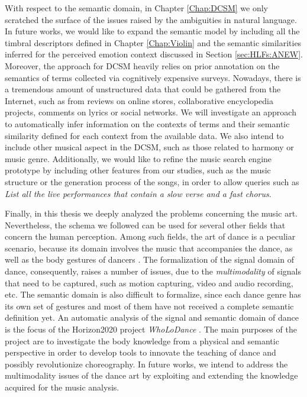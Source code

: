 With respect to the semantic domain, in  Chapter \ref{Chap:DCSM} we only scratched the surface of the issues raised by the ambiguities in natural language. In future works, we would like to expand the semantic model by including all the timbral descriptors defined in Chapter \ref{Chap:Violin} and the semantic similarities inferred for the perceived emotion context discussed in Section \ref{sec:HLFs:ANEW}. Moreover, the approach for DCSM heavily relies on prior annotation on the semantics of terms collected via cognitively expensive surveys. Nowadays, there is a tremendous amount of unstructured data that could be gathered from the Internet, such as from reviews on online stores, collaborative encyclopedia projects, comments on lyrics or social networks. We will investigate an approach to automatically infer information on the contexts of terms and their semantic similarity defined for each context from the available data. We also intend to include other musical aspect in the DCSM, such as those related to harmony or music genre. Additionally, we would like to refine the music search engine prototype by including other features from our studies, such as the music structure or the generation process of the songs, in order to allow queries such as \textit{List all the live performances that contain a slow verse and a fast chorus}.

Finally, in this thesis we deeply analyzed the problems concerning the music art. Nevertheless, the schema we followed can be used for several other fields that concern the human perception. Among such fields, the art of dance is a peculiar scenario, because its domain involves the music that accompanies the dance, as well as the body gestures of dancers \cite{camurri2003multimodal}. The formalization of the signal domain of dance, consequently, raises a number of issues, due to the \textit{multimodality} of signals that need to be captured, such as  motion capturing, video and audio recording, etc. The semantic domain is also difficult to formalize, since each dance genre has its own set of gestures and most of them have not received a complete semantic definition yet. An automatic analysis of the signal and semantic domain of dance is the focus of the Horizon2020 project \textit{WhoLoDance} \cite{WholoDance:2016}. The main purposes of the project are to investigate the body knowledge from a physical and semantic perspective in order to develop tools to innovate the teaching of dance and possibly revolutionize choreography. In future works, we intend to address the multimodality issues of the dance art by exploiting and extending the knowledge acquired for the music analysis. 